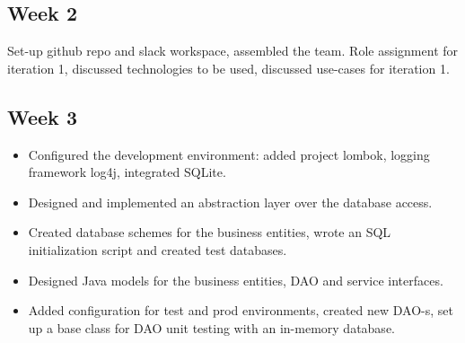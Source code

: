 \documentclass[12pt]{article}
\begin{document}
\maketitle

\subsection*{Week 2}
Set-up github repo and slack workspace, assembled the team. Role assignment for iteration 1, discussed technologies to be used, discussed use-cases for iteration 1.

\subsection*{Week 3}
\begin{itemize}
\item Configured the development environment: added project lombok, logging framework log4j, integrated SQLite. 

\item Designed and implemented an abstraction layer over the database access. 

\item Created database schemes for the business entities, wrote an SQL initialization script and created test databases. 

\item Designed Java models for the business entities, DAO and service interfaces. 

\item Added configuration for test and prod environments, created new DAO-s, set up a base class for DAO unit testing with an in-memory database. 
\end{itemize}
\end{document}
